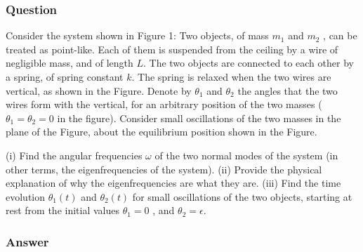 \subsubsection{Question}

Consider the system shown in Figure 1: Two objects, of mass $m_1$ and $m_2$ , can be treated as point-like. Each of them is suspended from the ceiling by a wire of negligible mass, and of length $L$. The two objects are connected to each other by a spring, of spring constant $k$. The spring is relaxed when the two wires are vertical, as shown in the Figure. Denote by $\theta_1$ and $\theta_2$ the angles that the two wires form with the vertical, for an arbitrary position of the two masses ($\theta_1 = \theta_2 = 0$ in the figure). Consider small oscillations of the two masses in the plane of the Figure, about the equilibrium position shown in the Figure.

(i) Find the angular frequencies $\omega$ of the two normal modes of the system (in other terms, the eigenfrequencies of the system). (ii) Provide the physical explanation of why the eigenfrequencies are what they are. (iii) Find the time evolution $\theta_1 (t)$ and $\theta_2 (t)$ for small oscillations of the two objects, starting at rest from the initial values $\theta_1 = 0$ , and $\theta_2 = \epsilon$.
\subsubsection{Answer}



